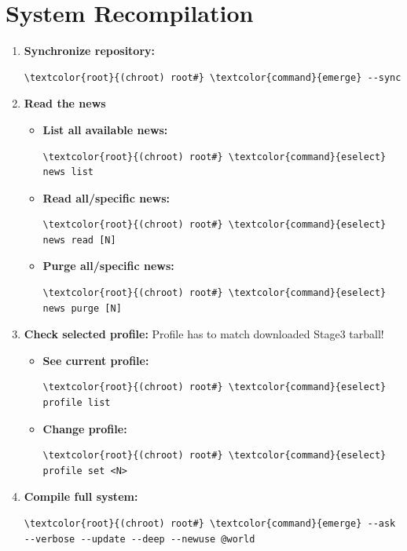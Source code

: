 \documentclass[10pt, a4paper, onecolumn, oneside, titlepage, openany]{book}
\begin{document}
\section{System Recompilation}
\begin{enumerate}
    \item \textbf{Synchronize repository:}
\begin{Verbatim}[commandchars=\\\{\}]
\textcolor{root}{(chroot) root#} \textcolor{command}{emerge} --sync
\end{Verbatim}
    \item \textbf{Read the news}
    \begin{itemize}
        \item \textbf{List all available news:}
\begin{Verbatim}[commandchars=\\\{\}]
\textcolor{root}{(chroot) root#} \textcolor{command}{eselect} news list
\end{Verbatim}
        \item \textbf{Read all/specific news:}
\begin{Verbatim}[commandchars=\\\{\}]
\textcolor{root}{(chroot) root#} \textcolor{command}{eselect} news read [N]
\end{Verbatim}
        \item \textbf{Purge all/specific news:}
\begin{Verbatim}[commandchars=\\\{\}]
\textcolor{root}{(chroot) root#} \textcolor{command}{eselect} news purge [N]
\end{Verbatim}
    \end{itemize}
    \item \textbf{Check selected profile:}
\newline Profile has to match downloaded Stage3 tarball!
    \begin{itemize}
        \item \textbf{See current profile:}
\begin{Verbatim}[commandchars=\\\{\}]
\textcolor{root}{(chroot) root#} \textcolor{command}{eselect} profile list
\end{Verbatim}
        \item \textbf{Change profile:}
\begin{Verbatim}[commandchars=\\\{\}]
\textcolor{root}{(chroot) root#} \textcolor{command}{eselect} profile set <N>
\end{Verbatim}
    \end{itemize}
    \item \textbf{Compile full system:}
\begin{Verbatim}[commandchars=\\\{\}]
\textcolor{root}{(chroot) root#} \textcolor{command}{emerge} --ask --verbose --update --deep --newuse @world
\end{Verbatim}
\end{enumerate}
\end{document}
